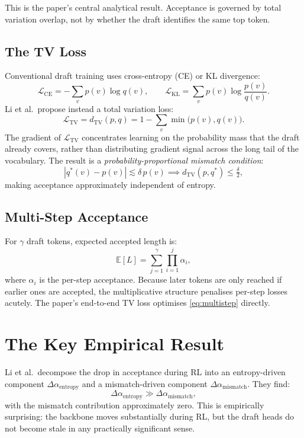 \documentclass[11pt, a4paper, openany]{book}
\theoremstyle{plain}
\theoremstyle{definition}
\theoremstyle{remark}
\newcommand{\TV}{d_{\mathrm{TV}}}
\newcommand{\E}{\mathbb{E}}
\begin{document}
This is the paper's central analytical result.
Acceptance is governed by total variation overlap, not by whether the draft
identifies the same top token.

\subsection{The TV Loss}

Conventional draft training uses cross-entropy (CE) or KL divergence:
\[
  \mathcal{L}_{\mathrm{CE}} = -\sum_v p(v)\log q(v), \qquad
  \mathcal{L}_{\mathrm{KL}} = \sum_v p(v)\log\frac{p(v)}{q(v)}.
\]
Li et al.\ propose instead a total variation loss:
\[
  \mathcal{L}_{\mathrm{TV}} = \TV(p, q) = 1 - \sum_v \min\!\bigl(p(v), q(v)\bigr).
\]
The gradient of $\mathcal{L}_{\mathrm{TV}}$ concentrates learning on the
probability mass that the draft already covers, rather than distributing
gradient signal across the long tail of the vocabulary.
The result is a \emph{probability-proportional mismatch condition}:
\[
  |q^*(v) - p(v)| \lesssim \delta\, p(v) \implies \TV(p, q^*) \leq \tfrac{\delta}{2},
\]
making acceptance approximately independent of entropy.

\subsection{Multi-Step Acceptance}

For $\gamma$ draft tokens, expected accepted length is:
\begin{equation}
  \E[L] = \sum_{j=1}^{\gamma} \prod_{i=1}^{j} \alpha_i,
  \label{eq:multistep}
\end{equation}
where $\alpha_i$ is the per-step acceptance.
Because later tokens are only reached if earlier ones are accepted,
the multiplicative structure penalises per-step losses acutely.
The paper's end-to-end TV loss optimises \eqref{eq:multistep} directly.

\section{The Key Empirical Result}

Li et al.\ decompose the drop in acceptance during RL into
an entropy-driven component $\Delta\alpha_{\mathrm{entropy}}$ and
a mismatch-driven component $\Delta\alpha_{\mathrm{mismatch}}$.
They find:
\[
  \Delta\alpha_{\mathrm{entropy}} \gg \Delta\alpha_{\mathrm{mismatch}},
\]
with the mismatch contribution approximately zero.
This is empirically surprising: the backbone moves substantially during RL,
but the draft heads do not become stale in any practically significant sense.
\end{document}
